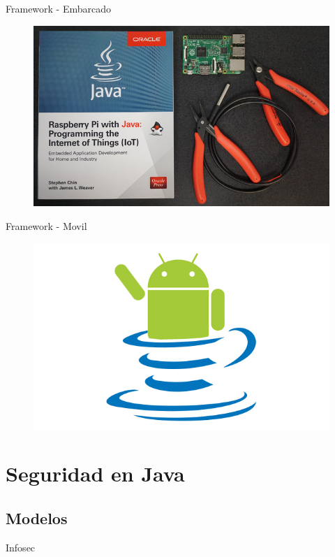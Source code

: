 \documentclass{beamer}
\begin{document}
\begin{frame}{Framework - Embarcado}
	\begin{figure}
		\centering
		\includegraphics[width=0.9\linewidth]{Images/javapy}
	\end{figure}
\end{frame}

\begin{frame}{Framework - Movil}
	\begin{figure}
		\centering
		\includegraphics[width=0.9\linewidth]{Images/android}
	\end{figure}
\end{frame}

\fi
\section{\faLock Seguridad en Java}
\subsection{Modelos}
\begin{frame}{Infosec}
\centering
{}
\end{frame}
\end{document}
